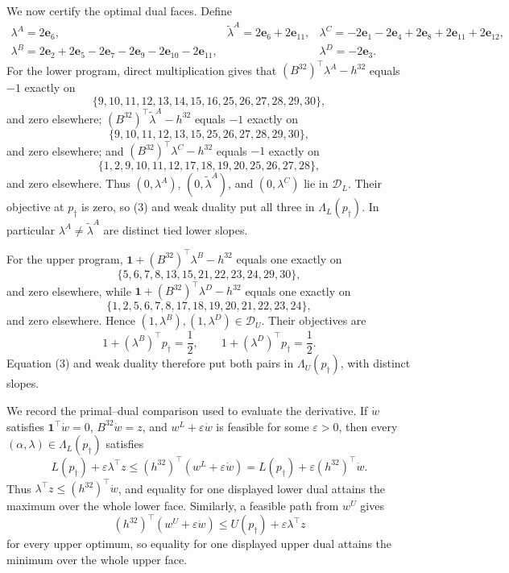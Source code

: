 We now certify the optimal dual faces.  Define
\[
\begin{array}{lll}
\lambda^A=2\mathbf e_6,
&\widetilde\lambda^A=2\mathbf e_6+2\mathbf e_{11},
&\lambda^C=-2\mathbf e_1-2\mathbf e_4+2\mathbf e_8+2\mathbf e_{11}+2\mathbf e_{12},\\
\lambda^B=2\mathbf e_2+2\mathbf e_5-2\mathbf e_7-2\mathbf e_9-2\mathbf e_{10}-2\mathbf e_{11},
&&\lambda^D=-2\mathbf e_3.
\end{array}
\tag{11}
\]
For the lower program, direct multiplication gives that \((B^{32})^{\top}\lambda^A-h^{32}\) equals \(-1\) exactly on
\[
\{9,10,11,12,13,14,15,16,25,26,27,28,29,30\},
\tag{12}
\]
and zero elsewhere; \((B^{32})^{\top}\widetilde\lambda^A-h^{32}\) equals \(-1\) exactly on
\[
\{9,10,11,12,13,15,25,26,27,28,29,30\},
\tag{13}
\]
and zero elsewhere; and \((B^{32})^{\top}\lambda^C-h^{32}\) equals \(-1\) exactly on
\[
\{1,2,9,10,11,12,17,18,19,20,25,26,27,28\},
\tag{14}
\]
and zero elsewhere.  Thus \((0,\lambda^A)\), \((0,\widetilde\lambda^A)\), and \((0,\lambda^C)\) lie in \(\mathcal D_L\).  Their objective at \(p_\dagger\) is zero, so (3) and weak duality put all three in \(\Lambda_L(p_\dagger)\).  In particular \(\lambda^A\neq\widetilde\lambda^A\) are distinct tied lower slopes.

For the upper program, \(\mathbf 1+(B^{32})^{\top}\lambda^B-h^{32}\) equals one exactly on
\[
\{5,6,7,8,13,15,21,22,23,24,29,30\},
\tag{15}
\]
and zero elsewhere, while \(\mathbf 1+(B^{32})^{\top}\lambda^D-h^{32}\) equals one exactly on
\[
\{1,2,5,6,7,8,17,18,19,20,21,22,23,24\},
\tag{16}
\]
and zero elsewhere.  Hence \((1,\lambda^B),(1,\lambda^D)\in\mathcal D_U\).  Their objectives are
\[
1+(\lambda^B)^{\top}p_\dagger=\frac12,
\qquad
1+(\lambda^D)^{\top}p_\dagger=\frac12.
\tag{17}
\]
Equation (3) and weak duality therefore put both pairs in \(\Lambda_U(p_\dagger)\), with distinct slopes.

We record the primal--dual comparison used to evaluate the derivative.  If \(\dot w\) satisfies \(\mathbf 1^{\top}\dot w=0\), \(B^{32}\dot w=z\), and \(w^L+\varepsilon\dot w\) is feasible for some \(\varepsilon>0\), then every \((\alpha,\lambda)\in\Lambda_L(p_\dagger)\) satisfies
\[
L(p_\dagger)+\varepsilon\lambda^{\top}z
\leq(h^{32})^{\top}(w^L+\varepsilon\dot w)
=L(p_\dagger)+\varepsilon(h^{32})^{\top}\dot w.
\tag{18}
\]
Thus \(\lambda^{\top}z\leq(h^{32})^{\top}\dot w\), and equality for one displayed lower dual attains the maximum over the whole lower face.  Similarly, a feasible path from \(w^U\) gives
\[
(h^{32})^{\top}(w^U+\varepsilon\dot w)
\leq U(p_\dagger)+\varepsilon\lambda^{\top}z
\tag{19}
\]
for every upper optimum, so equality for one displayed upper dual attains the minimum over the whole upper face.

